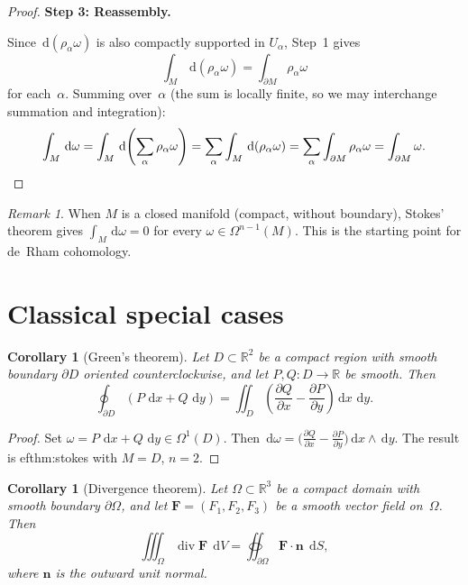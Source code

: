 \documentclass[12pt,a4paper,openany]{book}
\newtheorem{corollary}[theorem]{Corollary}
\theoremstyle{definition}
\theoremstyle{remark}
\newtheorem{remark}[theorem]{Remark}
\newcommand{\R}{\mathbb{R}}
\newcommand{\dd}{\,\mathrm{d}}
\begin{document}
\begin{proof}
\medskip\noindent\textbf{Step 3: Reassembly.}

Since $\dd(\rho_\alpha\omega)$ is also compactly supported in $U_\alpha$,
Step~1 gives
\[
  \int_M \dd(\rho_\alpha\omega) = \int_{\partial M} \rho_\alpha\omega
\]
for each~$\alpha$.  Summing over~$\alpha$ (the sum is locally finite,
so we may interchange summation and integration):
\[
  \int_M \dd\omega
  = \int_M \dd\!\left(\sum_\alpha \rho_\alpha\omega\right)
  = \sum_\alpha \int_M \dd(\rho_\alpha\omega)
  = \sum_\alpha \int_{\partial M}\rho_\alpha\omega
  = \int_{\partial M}\omega. \qedhere
\]
\end{proof}

\begin{remark}\label{rem:stokes-closed-manifolds}
When $M$ is a closed manifold (compact, without boundary), Stokes'
theorem gives $\int_M\dd\omega = 0$ for every
$\omega\in\Omega^{n-1}(M)$.  This is the starting point for de~Rham
cohomology.
\end{remark}

\section{Classical special cases}\label{sec:stokes-classical}

\begin{corollary}[Green's theorem]\label{cor:green}
Let $D\subset\R^2$ be a compact region with smooth boundary
$\partial D$ oriented counterclockwise, and let $P,Q\colon D\to\R$
be smooth.  Then
\[
  \oint_{\partial D}(P\,\dd x + Q\,\dd y)
  = \iint_D \left(\frac{\partial Q}{\partial x}
    - \frac{\partial P}{\partial y}\right)\dd x\,\dd y.
\]
\end{corollary}

\begin{proof}
Set $\omega = P\,\dd x + Q\,\dd y\in\Omega^1(D)$.  Then
$\dd\omega = \bigl(\frac{\partial Q}{\partial x} - \frac{\partial P}{\partial y}\bigr)\dd x\wedge\dd y$.
The result is 
ef{thm:stokes} with $M = D$, $n = 2$.
\end{proof}

\begin{corollary}[Divergence theorem]\label{cor:divergence}
Let $\Omega\subset\R^3$ be a compact domain with smooth boundary
$\partial\Omega$, and let $\mathbf{F} = (F_1,F_2,F_3)$ be a smooth
vector field on~$\Omega$.  Then
\[
  \iiint_\Omega \operatorname{div}\mathbf{F}\;\dd V
  = \oiint_{\partial\Omega} \mathbf{F}\cdot\mathbf{n}\;\dd S,
\]
where $\mathbf{n}$ is the outward unit normal.
\end{corollary}
\end{document}
